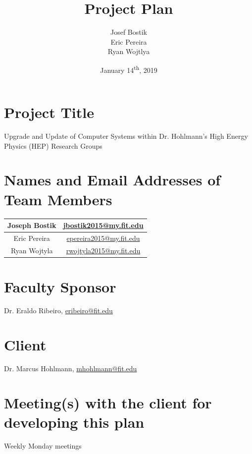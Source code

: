 \documentclass[12pt]{article}
\newcommand\tab[1][1cm]{\hspace*{#1}}
\begin{document}
\begin{titlepage}
	

\author{Josef Bostik\\
	Eric Pereira\\
	Ryan Wojtlya\\}
\date{January 14\textsuperscript{th}, 2019}
\title{Project Plan}
\maketitle
\end{titlepage}
\tableofcontents
\newpage
{}

\section{Project Title}
\tab Upgrade and Update of Computer Systems within Dr. Hohlmann's High Energy Physics (HEP) Research Groups

\section{Names and Email Addresses of Team Members}
\tab
\begin{tabular}{| c | c |}
	\hline
	Joseph Bostik & \href{mailto: jbostik2015@my.fit.edu}{jbostik2015@my.fit.edu} \\
	\hline
	Eric Pereira & \href{mailto: epereira2015@my.fit.edu}{epereira2015@my.fit.edu} \\
	\hline
	Ryan Wojtyla & \href{mailto: rwojtyla2015@my.fit.edu}{rwojtyla2015@my.fit.edu} \\
	\hline
\end{tabular}

\section{Faculty Sponsor}
\tab Dr. Eraldo Ribeiro, \href{mailto: eribeiro@fit.edu}{eribeiro@fit.edu}

\section{Client}
\tab Dr. Marcus Hohlmann, \href{mailto: mhohlmann@fit.edu}{mhohlmann@fit.edu}

\section{Meeting(s) with the client for developing this plan}
\tab Weekly Monday meetings
\end{document}
